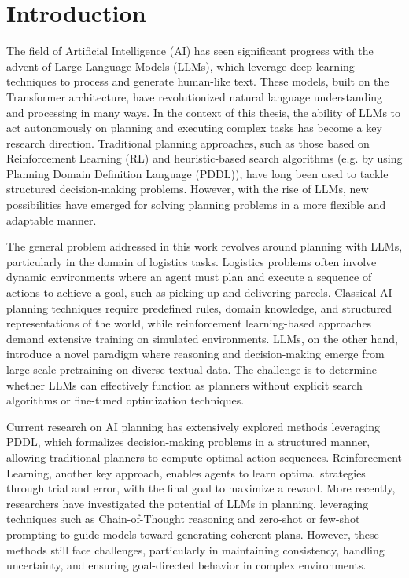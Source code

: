 \chapter{Introduction}
\label{cha:introduction}

The field of Artificial Intelligence (AI) has seen significant progress with the
advent of Large Language Models (LLMs), which leverage deep learning techniques to
process and generate human-like text. These models, built on the Transformer architecture,
have revolutionized natural language understanding and processing in many ways. In
the context of this thesis, the ability of LLMs to act autonomously on planning
and executing complex tasks has become a key research direction. Traditional planning
approaches, such as those based on Reinforcement Learning (RL) and heuristic-based
search algorithms (e.g. by using Planning Domain Definition Language (PDDL)),
have long been used to tackle structured decision-making problems. However, with
the rise of LLMs, new possibilities have emerged for solving planning problems in
a more flexible and adaptable manner.

The general problem addressed in this work revolves around planning with LLMs,
particularly in the domain of logistics tasks. Logistics problems often involve dynamic
environments where an agent must plan and execute a sequence of actions to achieve
a goal, such as picking up and delivering parcels. Classical AI planning techniques
require predefined rules, domain knowledge, and structured representations of the
world, while reinforcement learning-based approaches demand extensive training
on simulated environments. LLMs, on the other hand, introduce a novel paradigm where
reasoning and decision-making emerge from large-scale pretraining on diverse textual
data. The challenge is to determine whether LLMs can effectively function as
planners without explicit search algorithms or fine-tuned optimization
techniques.

Current research on AI planning has extensively explored methods leveraging PDDL,
which formalizes decision-making problems in a structured manner, allowing
traditional planners to compute optimal action sequences. Reinforcement Learning,
another key approach, enables agents to learn optimal strategies through trial and
error, with the final goal to maximize a reward. More recently, researchers have
investigated the potential of LLMs in planning, leveraging techniques such as Chain-of-Thought
reasoning and zero-shot or few-shot prompting to guide models toward generating coherent
plans. However, these methods still face challenges, particularly in maintaining
consistency, handling uncertainty, and ensuring goal-directed behavior in
complex environments.

